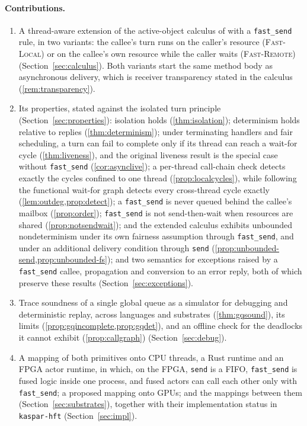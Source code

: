\documentclass[11pt]{article}
\theoremstyle{definition}
\theoremstyle{remark}
\newcommand{\fs}{\texttt{fast\_send}}
\newcommand{\snd}{\texttt{send}}
\newcommand{\kh}{\texttt{kaspar-hft}}
\begin{document}
\paragraph{Contributions.}
\begin{enumerate}[leftmargin=1.6em]
  \item A thread-aware extension of the active-object calculus of
  \cite{dekoster2024} with a \fs{} rule, in two variants: the callee's turn runs on the
  caller's resource (\textsc{Fast-Local}) or on the callee's own resource while the
  caller waits (\textsc{Fast-Remote}) (Section~\ref{sec:calculus}). Both variants start
  the same method body as asynchronous delivery, which is receiver transparency stated
  in the calculus (\cref{rem:transparency}).
  \item Its properties, stated against the isolated turn principle
  (Section~\ref{sec:properties}): isolation holds (\cref{thm:isolation});
  determinism holds relative to replies (\cref{thm:determinism}); under terminating
  handlers and fair scheduling, a turn can fail to complete only if its thread can reach
  a wait-for cycle (\cref{thm:liveness}), and the
  original liveness result is the special case without \fs{}
  (\cref{cor:asynclive}); a per-thread call-chain check detects exactly the cycles
  confined to one thread (\cref{prop:localcycles}), while following the functional
  wait-for graph detects every cross-thread cycle exactly
  (\cref{lem:outdeg,prop:detect}); a \fs{} is never queued behind the
  callee's mailbox (\cref{prop:order}); \fs{} is not send-then-wait when resources are shared
  (\cref{prop:notsendwait}); and the extended calculus exhibits unbounded nondeterminism
  under its own fairness assumption through \fs{}, and under an additional delivery
  condition through \snd{} (\cref{prop:unbounded-send,prop:unbounded-fs}); and two
  semantics for exceptions raised by a \fs{} callee, propagation and conversion to an
  error reply, both of which preserve these results (Section~\ref{sec:exceptions}).
  \item Trace soundness of a single global queue as a simulator for debugging and
  deterministic replay, across languages and substrates (\cref{thm:gqsound}), its limits
  (\cref{prop:gqincomplete,prop:gqdet}), and an offline check for the deadlocks it cannot
  exhibit (\cref{prop:callgraph}) (Section~\ref{sec:debug}).
  \item A mapping of both primitives onto CPU threads, a Rust runtime and an FPGA actor
  runtime, in which, on the FPGA, \snd{} is a FIFO, \fs{} is fused logic inside one
  process, and fused actors can call each other only with \fs{}; a proposed mapping onto
  GPUs; and the mappings between them (Section~\ref{sec:substrates}), together with
  their implementation status in \kh{} (Section~\ref{sec:impl}).
\end{enumerate}
\end{document}
